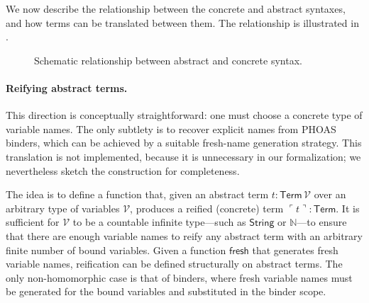 We now describe the relationship between the concrete and abstract syntaxes, and
how terms can be translated between them.
The relationship is illustrated in .

\begin{figure}[t]
  \centering
  \caption{Schematic relationship between abstract and concrete syntax.}
  \label{fig:syntax-representation}
\end{figure}


\paragraph{Reifying abstract terms.}
This direction is conceptually straightforward: one must choose a concrete type
of variable names.
The only subtlety is to recover explicit names from PHOAS binders, which can be
achieved by a suitable fresh-name generation strategy.
This translation is not implemented, because it is unnecessary in our
formalization; we nevertheless sketch the construction for completeness.

The idea is to define a function that, given an abstract term \(t : \mathsf{Term}\,\mathcal{V}\)
over an arbitrary type of variables \(\mathcal{V}\),
produces a reified (concrete) term \( \ulcorner t \urcorner : \mathsf{Term} \).
It is sufficient for \(\mathcal{V}\) to be a countable infinite type---such as
\(\mathsf{String}\) or \(\mathbb{N}\)---to ensure that there are enough
variable names to reify any abstract term with an arbitrary finite number of
bound variables.
Given a function \(\mathsf{fresh}\) that generates fresh variable names,
reification can be defined structurally on abstract terms.
The only non-homomorphic case is that of binders, where fresh variable names
must be generated for the bound variables and substituted in the binder scope.

